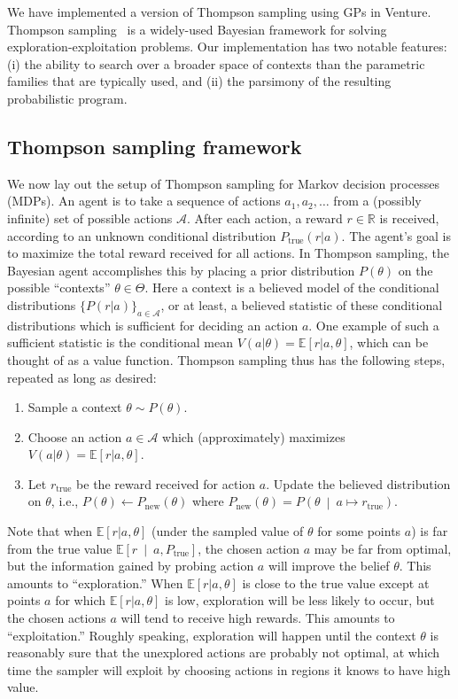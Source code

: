 \documentclass{article} %
\newcommand{\true}{{\textrm{true}}}
\newcommand{\rmnew}{{\textrm{new}}}
\newcommand{\Acal}{\mathcal{A}}
\newcommand{\R}{\mathbb{R}}
\newcommand{\pn}[1]{\left( #1 \right)}
\newcommand{\bkt}[1]{\left[ #1 \right]}
\newcommand{\Ebkt}[1]{\mathbb{E}\bkt{#1}}
\newcommand{\mvert}{\ \middle\vert\ }
\begin{document}
We have implemented a version of Thompson sampling using GPs in Venture.
Thompson sampling~\cite{thompson1933likelihood} is a widely-used Bayesian framework for solving exploration-exploitation problems.
Our implementation has two notable features: (i) the ability to search over a broader space of contexts than the parametric families that are typically used, and (ii) the parsimony of the resulting probabilistic program.

\subsection{Thompson sampling framework}
We now lay out the setup of Thompson sampling for Markov decision processes (MDPs).
An agent is to take a sequence of actions $a_1, a_2, \ldots$ from a (possibly infinite) set of possible actions $\Acal$.
After each action, a reward $r \in \R$ is received, according to an unknown conditional distribution $P_\true(r|a)$.
The agent's goal is to maximize the total reward received for all actions.
In Thompson sampling, the Bayesian agent accomplishes this by placing a prior distribution $P(\theta)$ on the possible ``contexts'' $\theta \in \Theta$.
Here a context is a believed model of the conditional distributions $\{P(r|a)\}_{a \in \Acal}$, or at least, a believed statistic of these conditional distributions which is sufficient for deciding an action $a$.
One example of such a sufficient statistic is the conditional mean $V(a|\theta) = \Ebkt{r|a,\theta}$, which can be thought of as a value function.
Thompson sampling thus has the following steps, repeated as long as desired:
\begin{enumerate}
  \item Sample a context $\theta \sim P(\theta)$.
  \item Choose an action $a \in \Acal$ which (approximately) maximizes $V(a|\theta) = \Ebkt{r|a,\theta}$.
  \item\label{itm:Thompson-conditioning}
    Let $r_\true$ be the reward received for action $a$.
    Update the believed distribution on $\theta$, i.e., $P(\theta) \gets P_\rmnew(\theta)$ where $P_\rmnew(\theta) = P\pn{\theta \mvert a \mapsto r_\true}$.
\end{enumerate}
Note that when $\Ebkt{r|a,\theta}$ (under the sampled value of $\theta$ for some points $a$) is far from the true value $\Ebkt{r \mvert a,P_\true}$, the chosen action $a$ may be far from optimal, but the information gained by probing action $a$ will improve the belief $\theta$.
This amounts to ``exploration.''
When $\Ebkt{r|a,\theta}$ is close to the true value except at points $a$ for which $\Ebkt{r|a,\theta}$ is low, exploration will be less likely to occur, but the chosen actions $a$ will tend to receive high rewards.
This amounts to ``exploitation.''
Roughly speaking, exploration will happen until the context $\theta$ is reasonably sure that the unexplored actions are probably not optimal, at which time the sampler will exploit by choosing actions in regions it knows to have high value.
\end{document}
